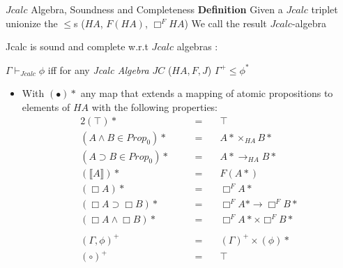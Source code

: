\documentclass{beamer}
\begin{document}
\begin{frame}{$Jcalc$ Algebra, Soundness and Completeness}
  \textbf{Definition}
   Given a $Jcalc$ triplet unionize the $\le$s ($HA$, $F(HA)$, $\Box^{F}HA$)
   We call the result  $Jcalc$-algebra
  
  \begin{theorem}
  Jcalc is sound and complete w.r.t $Jcalc$ algebras :
  
    $\Gamma\vdash_{Jcalc}\phi$ iff for any \textit{Jcalc Algebra}  $JC$ ($HA,F,J$)
    $\Gamma^+\leq\phi^{*}$ 
  \end{theorem}
\end{frame}
\begin{frame}
  \begin{itemize}
    \item[] With $(\bullet)*$  any map that extends a mapping of atomic propositions
    to elements of $HA$ with the following properties:
  \begin{alignat*}{2}
    (\top)* &&\quad= & \quad\top\\
    (A\wedge B \in Prop_0)*  &&\quad = & \quad  A*\times_{HA}B*\\
    (A\supset B \in Prop_0)*  &&\quad = & \quad A*\rightarrow_{HA} B*\\
    (\llbracket A\rrbracket)* && \quad = & \quad F(A*)\\					
    (\Box A)* &&\quad = & \quad\Box^F A* \\
    (\Box A\supset \Box B)*  &&\quad = & \quad\Box^F A* \rightarrow{\Box^F B*}\\
    (\Box A\wedge\Box B)*  &&\quad = & \quad\Box^F A*\times{\Box^F B*}\\
    \\
    (\Gamma,\phi)^+ &&\quad = & \quad  (\Gamma)^+\times(\phi)*\\
    (\circ)^+ &&\quad = & \quad\top
  \end{alignat*}
\end{itemize}
\end{frame}
\end{document}
